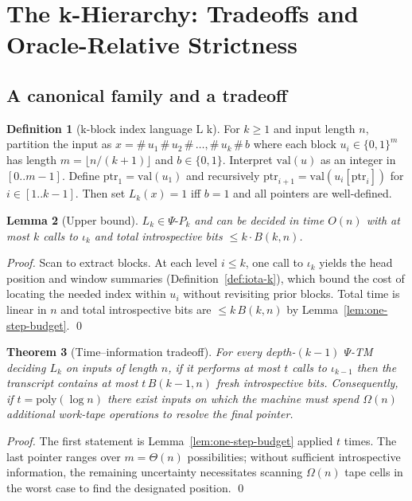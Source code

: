 \documentclass[11pt]{article}
\newtheorem{theorem}{Theorem}[section]
\newtheorem{lemma}[theorem]{Lemma}
\theoremstyle{plain}
\theoremstyle{definition}
\newtheorem{definition}[theorem]{Definition}
\newcommand{\PSi}{\Psi}
\newcommand{\PsiPk}{\PSi\text{-}P_k}
\newcommand{\bits}{\{0,1\}}
\begin{document}
\section{The k-Hierarchy: Tradeoffs and Oracle-Relative Strictness}

\subsection{A canonical family and a tradeoff}

\begin{definition}[k-block index language L k]
\label{def:Lk}
For $k\ge1$ and input length $n$, partition the input as $x=\#\,u_1\,\#\,u_2\,\#\,\ldots,\#\,u_k\,\#\,b$ where each block $u_i\in\bits^{m}$ has length $m=\lfloor n/(k{+}1)\rfloor$ and $b\in\bits$. Interpret $\mathrm{val}(u)$ as an integer in $[0..m{-}1]$. Define $\mathrm{ptr}_1=\mathrm{val}(u_1)$ and recursively $\mathrm{ptr}_{i+1}=\mathrm{val}(u_{i}[\mathrm{ptr}_i])$ for $i\in[1..k{-}1]$. Then set $L_k(x)=1$ iff $b=1$ and all pointers are well-defined.
\end{definition}

\begin{lemma}[Upper bound]
\label{lem:Lk-upper}
$L_k\in \PsiPk$ and can be decided in time $O(n)$ with at most $k$ calls to $\iota_k$ and total introspective bits $\le k\cdot B(k,n)$.
\end{lemma}
\begin{proof}
Scan to extract blocks. At each level $i\le k$, one call to $\iota_k$ yields the head position and window summaries (Definition~\ref{def:iota-k}), which bound the cost of locating the needed index within $u_i$ without revisiting prior blocks. Total time is linear in $n$ and total introspective bits are $\le k\,B(k,n)$ by Lemma~\ref{lem:one-step-budget}. \qed
\end{proof}

\begin{theorem}[Time--information tradeoff]
\label{thm:tradeoff}
For every depth-$(k{-}1)$ $\PSi$-TM deciding $L_k$ on inputs of length $n$, if it performs at most $t$ calls to $\iota_{k-1}$ then the transcript contains at most $t\,B(k{-}1,n)$ fresh introspective bits. Consequently, if $t=\mathrm{poly}(\log n)$ there exist inputs on which the machine must spend $\Omega(n)$ additional work-tape operations to resolve the final pointer.
\end{theorem}
\begin{proof}
The first statement is Lemma~\ref{lem:one-step-budget} applied $t$ times. The last pointer ranges over $m=\Theta(n)$ possibilities; without sufficient introspective information, the remaining uncertainty necessitates scanning $\Omega(n)$ tape cells in the worst case to find the designated position. \qed
\end{proof}
\end{document}
